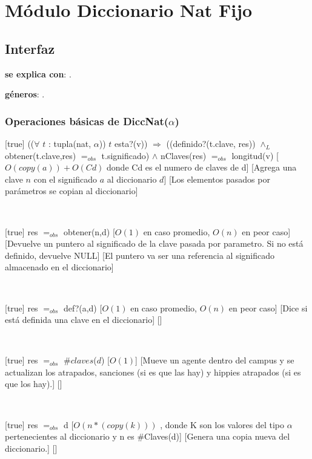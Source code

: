\section{Módulo Diccionario Nat Fijo}

\subsection{Interfaz}

\textbf{se explica con}: .

\textbf{géneros}: .

\subsubsection{Operaciones básicas de DiccNat($\alpha$)}

[true]
{(($\forall$ $t$ : tupla(nat, $\alpha$)) $t$ esta?(v)) $\Rightarrow$ ((definido?(t.clave, res))
	$\land_L$ obtener(t.clave,res) $=_{obs}$ t.significado) $\land$ nClaves(res) $=_{obs}$ longitud(v)}
[$O(copy(a)) + O(Cd)$ donde Cd es el numero de claves de d]
[Agrega una clave $n$ con el significado $a$ al diccionario $d$]
[Los elementos pasados por parámetros se copian al diccionario]

~

[true]
{res $=_{obs}$ obtener(n,d)}
[$O(1)$ en caso promedio, $O(n)$ en peor caso]
[Devuelve un puntero al significado de la clave pasada por parametro. Si no está definido, devuelve NULL]
[El puntero va ser una referencia al significado almacenado en el diccionario]

~

[true]
{res $=_{obs}$ def?(a,d)}
[$O(1)$ en caso promedio, $O(n)$ en peor caso]
[Dice si está definida una clave en el diccionario]
[]

~

[true]
{res $=_{obs}$ $ \# claves$($d$)}
[$O(1)$]
[Mueve un agente dentro del campus y se actualizan los atrapados, sanciones (si es que las hay) y hippies atrapados (si es que los hay).]
[]

~

[true]
{res $=_{obs}$ d}
[$O(n*(copy(k)))$ , donde K son los valores del tipo $\alpha$ pertenecientes al diccionario y n es $\#$Claves(d)]
[Genera una copia nueva del diccionario.]
[]

